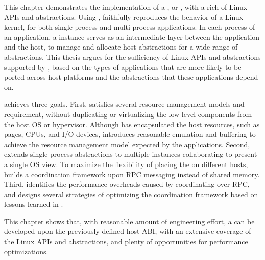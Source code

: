 
This chapter demonstrates the implementation of a \libos{}, or \thelibos{}, with a rich of Linux APIs and abstractions.
Using \thehostabi{},
\thelibos{} faithfully reproduces the behavior of a Linux kernel,
for both single-process and multi-process applications.
In each process of an application,
a \thelibos{} instance serves as an intermediate layer
between the application and the host,
to manage and allocate host abstractions for a wide range of \libos{} abstractions.
This thesis argues for the sufficiency of Linux APIs and abstractions
supported by \thelibos{},
based on the types of applications that are more likely to be ported across host platforms and the abstractions that these applications depend on.


\thelibos{} achieves three goals.
First, \thelibos{} satisfies
several resource management models and requirement, without duplicating or virtualizing the low-level components from the host OS or hypervisor.
Although \thehostabi{} has encapsulated the host resources,
such as pages, CPUs, and I/O devices,
\thelibos{} introduces reasonable emulation and buffering to achieve the resource management model expected by the applications.
Second, \thelibos{} extends single-process abstractions
to multiple \thelibos{} instances collaborating to present a single OS view.
To maximize the flexibility of placing the \picoprocs{}
on different hosts,
\thelibos{} builds a coordination framework upon RPC messaging instead of shared memory.
Third, \thelibos{} identifies the performance overheads
caused by coordinating over RPC, 
and designs several strategies of optimizing the coordination framework
based on lessons learned in \graphene{}.


This chapter shows that, with reasonable amount of engineering effort,
a \libos{} can be developed upon the previously-defined host ABI, with an extensive coverage of the Linux APIs and abstractions, and plenty of opportunities for performance optimizations.
